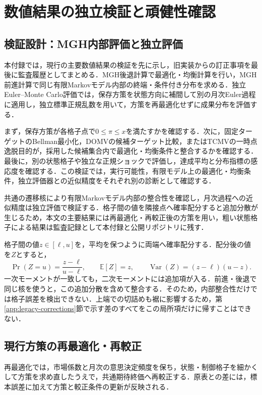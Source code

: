 \documentclass[10pt,a4paper]{article}
\theoremstyle{plain}
\theoremstyle{definition}
\newcommand{\E}{\mathbb{E}}
\DeclareMathOperator{\Var}{Var}
\begin{document}
\clearpage
\section{数値結果の独立検証と頑健性確認}\label{app:corrections}
\subsection{検証設計：MGH内部評価と独立評価}\label{app:validation-design}
本付録では，現行の主要数値結果の検証を先に示し，旧実装からの訂正事項を最後に監査履歴としてまとめる．MGH後退計算で最適化・均衡計算を行い，MGH前進計算で同じ有限Markovモデル内部の終端・条件付き分布を求める．独立Euler--Monte Carlo評価では，保存方策を状態方向に補間して別の月次Euler過程に適用し，独立標準正規乱数を用いて，方策を再最適化せずに成果分布を評価する．

まず，保存方策が各格子点で$0\leq\pi\leq x$を満たすかを確認する．次に，固定ターゲットのBellman最小化，DOMVの候補ターゲット比較，またはTCMVの一時点逸脱目的が，採用した候補集合内で最適化・均衡条件と整合するかを確認する．最後に，別の状態格子や独立な正規ショックで評価し，達成平均と分布指標の感応度を確認する．この検証では，実行可能性，有限モデル上の最適化・均衡条件，独立評価器との近似精度をそれぞれ別の診断として確認する．

共通の遷移核により有限Markovモデル内部の整合性を確認し，月次過程への近似精度は独立評価で検証する．格子間の値を隣接点へ確率配分すると追加分散が生じるため，本文の主要結果には再最適化・再較正後の方策を用い，粗い状態格子による結果は監査記録として本付録と公開リポジトリに残す．

格子間の値$z\in[\ell,u]$を，平均を保つように両端へ確率配分する．配分後の値を$Z$とすると，
\begin{equation}
\Pr(Z=u)=\frac{z-\ell}{u-\ell},\qquad
\E[Z]=z,\qquad \Var(Z)=(z-\ell)(u-z).
\end{equation}
一次モーメントが一致しても，二次モーメントには追加項が入る．前進・後退で同じ核を使うと，この追加分散を含めて整合する．そのため，内部整合性だけでは格子誤差を検出できない．上端での切詰めも裾に影響するため，第\ref{app:legacy-corrections}節で示す差のすべてをこの局所項だけに帰すことはできない．

\subsection{現行方策の再最適化・再較正}\label{app:validation-recalibration}
再最適化では，市場係数と月次の意思決定頻度を保ち，状態・制御格子を細かくして方策を求め直したうえで，共通期待終価へ再較正する．原表との差には，標本誤差に加えて方策と較正条件の更新が反映される．
\end{document}
